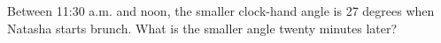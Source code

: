 Between 11:30 a.m. and noon, the smaller clock-hand angle is 27 degrees when Natasha starts brunch. What is the smaller angle twenty minutes later?
